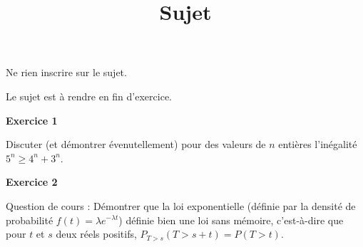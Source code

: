 \documentclass[12pt,a4paper,french]{article}
\author{}
\title{Sujet \no{9}}
\date{}
\begin{document}
\maketitle
\begin{center}Ne rien inscrire sur le sujet.

  Le sujet est à rendre en fin d'exercice.
\end{center}

\bigskip

\textbf{Exercice 1}

Discuter (et démontrer évenutellement) pour des valeurs de $n$ entières
l'inégalité $5^n \geqslant 4^n + 3^n$.

\medskip

\textbf{Exercice 2}

Question de cours : Démontrer que la loi exponentielle (définie par la
densité de probabilité $f(t) = \lambda e^{-\lambda t}$) définie bien une
loi sans mémoire, c'est-à-dire que pour $t$ et $s$ deux réels positifs,
$P_{T>s}(T > s+t) = P(T > t)$.
\end{document}

